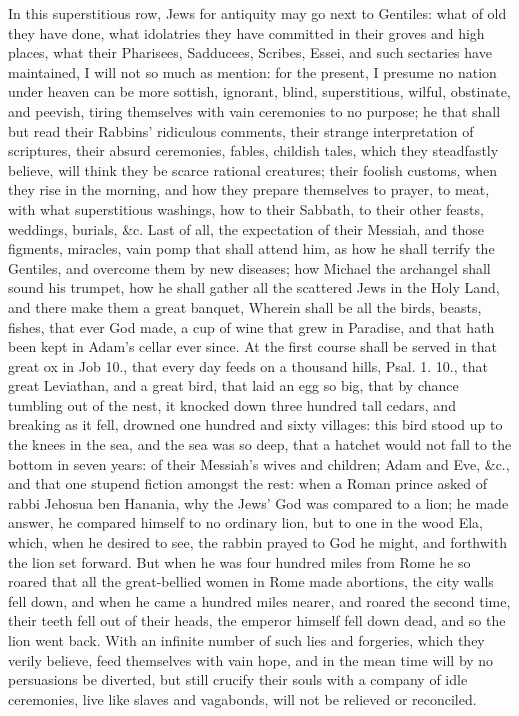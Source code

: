 {In this superstitious row, Jews for antiquity may go next to Gentiles:
what of old they have done, what idolatries they have committed in
their groves and high places, what their Pharisees, Sadducees, Scribes,
Essei, and such sectaries have maintained, I will not so much as
mention: for the present, I presume no nation under heaven can be more
sottish, ignorant, blind, superstitious, wilful, obstinate, and
peevish, tiring themselves with vain ceremonies to no purpose; he that
shall but read their Rabbins' ridiculous comments, their strange
interpretation of scriptures, their absurd ceremonies, fables, childish
tales, which they steadfastly believe, will think they be scarce
rational creatures; their foolish customs, when they rise in the
morning, and how they prepare themselves to prayer, to meat, with what
superstitious washings, how to their Sabbath, to their other feasts,
weddings, burials, \&c. Last of all, the expectation of their Messiah,
and those figments, miracles, vain pomp that shall attend him, as how
he shall terrify the Gentiles, and overcome them by new diseases; how
Michael the archangel shall sound his trumpet, how he shall gather all
the scattered Jews in the Holy Land, and there make them a great
banquet,  Wherein shall be all the birds, beasts, fishes, that
ever God made, a cup of wine that grew in Paradise, and that hath been
kept in Adam's cellar ever since. At the first course shall be served
in that great ox in Job  10., that every day feeds on a thousand
hills, Psal. 1. 10., that great Leviathan, and a great bird, that laid
an egg so big, that by chance tumbling out of the nest, it
knocked down three hundred tall cedars, and breaking as it fell,
drowned one hundred and sixty villages: this bird stood up to the knees
in the sea, and the sea was so deep, that a hatchet would not fall to
the bottom in seven years: of their Messiah's wives and children;
Adam and Eve, \&c., and that one stupend fiction amongst the rest: when
a Roman prince asked of rabbi Jehosua ben Hanania, why the Jews' God
was compared to a lion; he made answer, he compared himself to no
ordinary lion, but to one in the wood Ela, which, when he desired to
see, the rabbin prayed to God he might, and forthwith the lion set
forward.  But when he was four hundred miles from Rome he so
roared that all the great-bellied women in Rome made abortions, the
city walls fell down, and when he came a hundred miles nearer, and
roared the second time, their teeth fell out of their heads, the
emperor himself fell down dead, and so the lion went back. With an
infinite number of such lies and forgeries, which they verily believe,
feed themselves with vain hope, and in the mean time will by no
persuasions be diverted, but still crucify their souls with a company
of idle ceremonies, live like slaves and vagabonds, will not be
relieved or reconciled.

}
